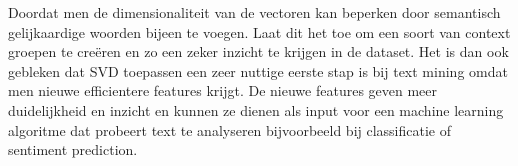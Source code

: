 Doordat men de dimensionaliteit van de vectoren kan beperken door semantisch gelijkaardige woorden bijeen te voegen. Laat dit het toe om een soort van context groepen te cre\"eren en zo een zeker inzicht te krijgen in de dataset. Het is dan ook gebleken dat SVD toepassen een zeer nuttige eerste stap is bij text mining \cite{maas2011learning} omdat men nieuwe efficientere features krijgt. De nieuwe features geven meer duidelijkheid en inzicht en kunnen ze dienen als input voor een machine learning algoritme dat probeert text te analyseren bijvoorbeeld bij classificatie of sentiment prediction.
